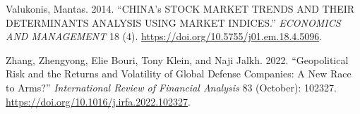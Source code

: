 \documentclass[
  letterpaper,
  DIV=11,
  numbers=noendperiod]{scrartcl}
\newlength{\cslhangindent}
\newlength{\cslentryspacingunit} %
\newenvironment{CSLReferences}[2] %
 {%
  \setlength{\parindent}{0pt}
  \ifodd #1
  \let\oldpar\par
  \def\par{\hangindent=\cslhangindent\oldpar}
  \fi
  \setlength{\parskip}{#2\cslentryspacingunit}
 }%
 {}
\begin{document}
\begin{CSLReferences}{1}{0}
\leavevmode{}%
Valukonis, Mantas. 2014. {``CHINA's STOCK MARKET TRENDS AND THEIR
DETERMINANTS ANALYSIS USING MARKET INDICES.''} \emph{ECONOMICS AND
MANAGEMENT} 18 (4). \url{https://doi.org/10.5755/j01.em.18.4.5096}.

\leavevmode{}%
Zhang, Zhengyong, Elie Bouri, Tony Klein, and Naji Jalkh. 2022.
{``Geopolitical Risk and the Returns and Volatility of Global Defense
Companies: A New Race to Arms?''} \emph{International Review of
Financial Analysis} 83 (October): 102327.
\url{https://doi.org/10.1016/j.irfa.2022.102327}.

\end{CSLReferences}
\end{document}
